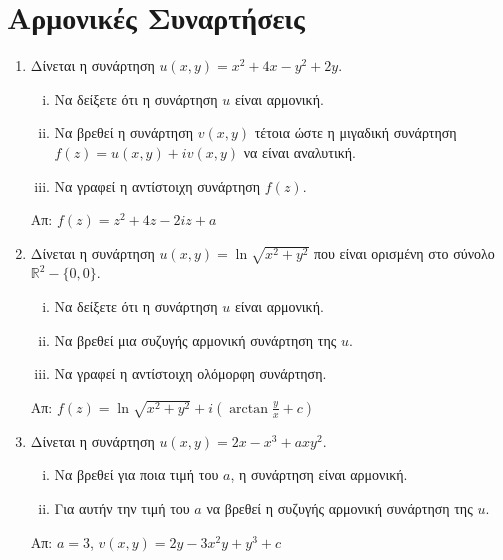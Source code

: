 \documentclass[a4paper,table]{report}
\begin{document}
\begin{center}
  \minibox{\large\bfseries \textcolor{Col1}{Ασκήσεις Ολοκληρώματα}}
\end{center}

\vspace{\baselineskip} 


\section*{Αρμονικές Συναρτήσεις}

\begin{enumerate}

  \item Δίνεται η συνάρτηση $ u(x,y) = x^{2} +4x-y^{2}+2y $. 
    \begin{enumerate}[i)]
      \item Να δείξετε ότι η συνάρτηση $ u $ είναι αρμονική.
      \item Να βρεθεί η συνάρτηση $ v(x,y) $ τέτοια ώστε η μιγαδική συνάρτηση 
        $ f(z) = u(x,y) + iv(x,y) $ να είναι αναλυτική. 
      \item Να γραφεί η αντίστοιχη συνάρτηση $ f(z) $.
    \end{enumerate}

    \hfill Απ: $ f(z) = z^{2}+4z-2iz+a $ 

  \item Δίνεται η συνάρτηση $ u(x,y) = \ln{\sqrt{x^{2}+y^{2}}} $ που είναι ορισμένη 
    στο σύνολο $ \mathbb{R}^{2}- \{ 0,0 \} $. 
    \begin{enumerate}[i)]
      \item Να δείξετε ότι η συνάρτηση $ u $ είναι αρμονική.
      \item Να βρεθεί μια συζυγής αρμονική συνάρτηση της $u$.
      \item Να γραφεί η αντίστοιχη ολόμορφη συνάρτηση.
    \end{enumerate}

    \hfill Απ: $ f(z) = \ln{\sqrt{x^{2}+y^{2}}} + i(\arctan{\frac{y}{x}} + c)  $ 

  \item Δίνεται η συνάρτηση $ u(x,y) = 2x-x^{3}+axy^{2} $. 
    \begin{enumerate}[i)]
      \item Να βρεθεί για ποια τιμή του $a$, η συνάρτηση είναι αρμονική. 
      \item Για αυτήν την τιμή του $a$ να βρεθεί η συζυγής αρμονική συνάρτηση της $u$.
    \end{enumerate} 

    \hfill Απ: $ a=3 $, $ v(x,y) = 2y-3x^{2}y+y^{3}+c $ 

\end{enumerate}
\end{document}
